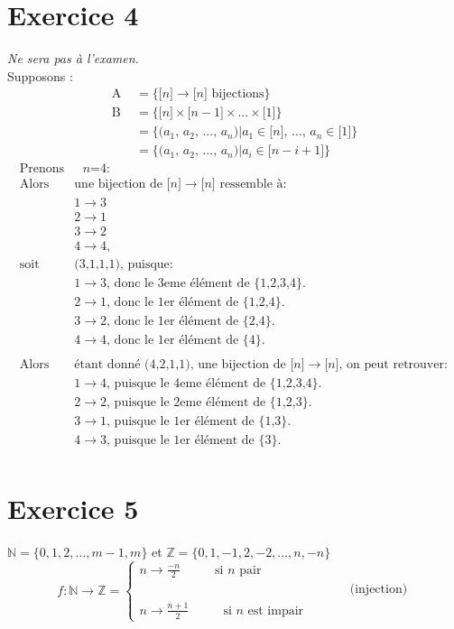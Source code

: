 \documentclass[fontsize=10pt]{article}
\begin{document}
\section*{Exercice 4}
\textit{Ne sera pas à l'examen.}\\
Supposons :
\begin{align*}
\text{A } &=\{\text{[$n$]}\rightarrow\text{[$n$] bijections}\}\\
\text{B } &=\{\text{[$n$]}\times\text{[$n-1$]}\times...\times\text{[1]}\}\\
&=\{\text{($a_1$, $a_2$, ..., $a_n$)|$a_1$}\in\text{[$n$], ..., $a_n$}\in\text{[1]}\}\\
&=\{\text{($a_1$, $a_2$, ..., $a_n$)|$a_i$}\in\text{[$n-i+1]$}\}
\end{align*}
\begin{align*}
\text{Prenons} & \text{ $n$=4:}\\
\text{Alors } & \text{une bijection de [$n$]}\rightarrow\text{[$n$]}\text{ ressemble à}:\\
& 1 \rightarrow 3\\
& 2 \rightarrow 1\\
& 3 \rightarrow 2\\
& 4 \rightarrow 4,\\
\text{soit } & \text{(3,1,1,1), puisque:}\\
& 1 \rightarrow 3 \text{, donc le 3eme élément de \{1,2,3,4\}.}\\
& 2 \rightarrow 1 \text{, donc le 1er élément de \{1,2,4\}.}\\
& 3 \rightarrow 2 \text{, donc le 1er élément de \{2,4\}.}\\
& 4 \rightarrow 4 \text{, donc le 1er élément de \{4\}.}\\
\\
\text{Alors } & \text{étant donné (4,2,1,1), une bijection de [$n$]}\rightarrow\text{[$n$], on peut retrouver}:\\
& 1 \rightarrow 4 \text{, puisque le 4eme élément de \{1,2,3,4\}.}\\
& 2 \rightarrow 2 \text{, puisque le 2eme élément de \{1,2,3\}.}\\
& 3 \rightarrow 1 \text{, puisque le 1er élément de \{1,3\}.}\\
& 4 \rightarrow 3 \text{, puisque le 1er élément de \{3\}.}\\
\end{align*}
\section*{Exercice 5}
$\mathbb{N}=\{ 0,1,2,\dots,m-1,m\}$ et $\mathbb{Z} = \{0,1,-1,2,-2,\dots,n,-n\}$
\[
  f:\mathbb{N}\rightarrow\mathbb{Z} =\begin{cases}
               n \rightarrow \frac{-n}{2} \hspace{1cm}\text{ si $n$ pair}\\
               \hspace{7cm}\text{(injection)}\\
               n \rightarrow \frac{n+1}{2} \hspace{1cm} \text{ si $n$ est impair}
            \end{cases}
\]
\end{document}
